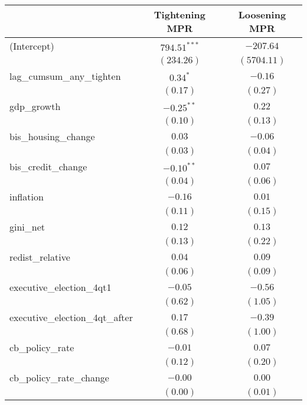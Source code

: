 
\begin{tabular}{l c c }
\hline
 & Tightening MPR & Loosening MPR \\
\hline
(Intercept)                     & $794.51^{***}$ & $-207.64$   \\
                                & $(234.26)$     & $(5704.11)$ \\
lag\_cumsum\_any\_tighten       & $0.34^{*}$     & $-0.16$     \\
                                & $(0.17)$       & $(0.27)$    \\
gdp\_growth                     & $-0.25^{**}$   & $0.22$      \\
                                & $(0.10)$       & $(0.13)$    \\
bis\_housing\_change            & $0.03$         & $-0.06$     \\
                                & $(0.03)$       & $(0.04)$    \\
bis\_credit\_change             & $-0.10^{**}$   & $0.07$      \\
                                & $(0.04)$       & $(0.06)$    \\
inflation                       & $-0.16$        & $0.01$      \\
                                & $(0.11)$       & $(0.15)$    \\
gini\_net                       & $0.12$         & $0.13$      \\
                                & $(0.13)$       & $(0.22)$    \\
redist\_relative                & $0.04$         & $0.09$      \\
                                & $(0.06)$       & $(0.09)$    \\
executive\_election\_4qt1       & $-0.05$        & $-0.56$     \\
                                & $(0.62)$       & $(1.05)$    \\
executive\_election\_4qt\_after & $0.17$         & $-0.39$     \\
                                & $(0.68)$       & $(1.00)$    \\
cb\_policy\_rate                & $-0.01$        & $0.07$      \\
                                & $(0.12)$       & $(0.20)$    \\
cb\_policy\_rate\_change        & $-0.00$        & $0.00$      \\
                                & $(0.00)$       & $(0.01)$    \\

\end{tabular}
